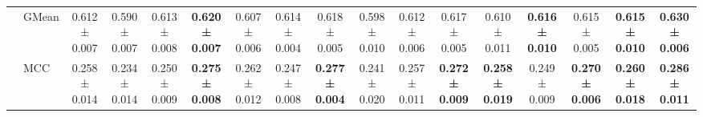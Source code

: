 \begin{table}[H]
{\begin{tabular}{llccccccccccccccc}
 & GMean & 0.612 ± 0.007 & 0.590 ± 0.007 & 0.613 ± 0.008 & \textbf{0.620 ± 0.007} & 0.607 ± 0.006 & 0.614 ± 0.004 & 0.618 ± 0.005 & 0.598 ± 0.010 & 0.612 ± 0.006 & 0.617 ± 0.005 & 0.610 ± 0.011 & \textbf{0.616 ± 0.010} & 0.615 ± 0.005 & \textbf{0.615 ± 0.010} & \textbf{0.630 ± 0.006} \\
 & MCC & 0.258 ± 0.014 & 0.234 ± 0.014 & 0.250 ± 0.009 & \textbf{0.275 ± 0.008} & 0.262 ± 0.012 & 0.247 ± 0.008 & \textbf{0.277 ± 0.004} & 0.241 ± 0.020 & 0.257 ± 0.011 & \textbf{0.272 ± 0.009} & \textbf{0.258 ± 0.019} & 0.249 ± 0.009 & \textbf{0.270 ± 0.006} & \textbf{0.260 ± 0.018} & \textbf{0.286 ± 0.011} \\
\cline{1-17}
\bottomrule
\end{tabular}
    }
\end{table}
